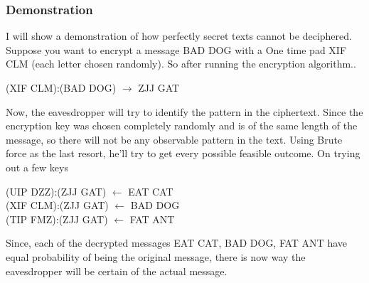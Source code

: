 \documentclass[12pt,a4paper]{extarticle}
\begin{document}
\subsubsection{Demonstration}
I will show a demonstration of how perfectly secret texts cannot be deciphered.\\

Suppose you want to encrypt a message BAD DOG with a One time pad XIF CLM (each letter chosen randomly). So after running the encryption algorithm..

\begin{center}
	(XIF CLM):(BAD DOG) $ \longrightarrow $  ZJJ GAT
\end{center}

Now, the eavesdropper will try to identify the pattern in the ciphertext. Since the encryption key was chosen completely randomly and is of the same length of the message, so there will not be any observable pattern in the text.  Using Brute force as the last resort, he'll try to get every possible feasible outcome. On trying out a few keys

\begin{center}
	(UIP DZZ):(ZJJ GAT) $ \longleftarrow $ EAT CAT\\
	(XIF CLM):(ZJJ GAT) $ \longleftarrow $  BAD DOG\\
	(TIP FMZ):(ZJJ GAT) $ \longleftarrow $ FAT ANT\\
\end{center}

Since, each of the decrypted messages EAT CAT, BAD DOG, FAT ANT have equal probability of being the original message, there is now way the eavesdropper will be certain of the actual message.
\end{document}
